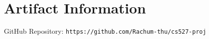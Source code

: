 \section{Artifact Information}

GitHub Repository: \small\texttt{https://github.com/Rachum-thu/cs527-proj}

